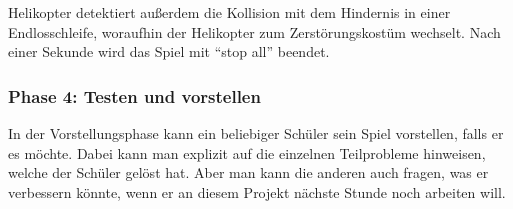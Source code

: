 Helikopter detektiert außerdem die Kollision mit dem Hindernis in einer
Endlosschleife, woraufhin der Helikopter zum Zerstörungskostüm wechselt.
Nach einer Sekunde wird das Spiel mit ``stop all'' beendet.

\subsubsection{Phase 4: Testen und
vorstellen}\label{phase-4-testen-und-vorstellen}

In der Vorstellungsphase kann ein beliebiger Schüler sein Spiel
vorstellen, falls er es möchte. Dabei kann man explizit auf die
einzelnen Teilprobleme hinweisen, welche der Schüler gelöst hat. Aber
man kann die anderen auch fragen, was er verbessern könnte, wenn er an
diesem Projekt nächste Stunde noch arbeiten will.
